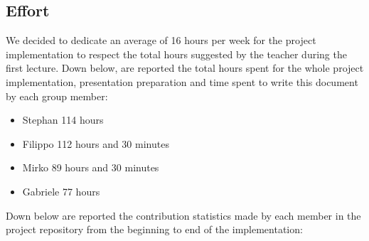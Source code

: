 \subsection{Effort}
We decided to dedicate an average of 16 hours per week for the project implementation to respect the total hours suggested by the teacher during the first lecture.\newline
Down below, are reported the total hours spent for the whole project implementation, presentation preparation and time spent to write this document by each group member:
\begin{itemize}
  \item Stephan 114 hours
  \item Filippo 112 hours and 30 minutes
  \item Mirko 89 hours and 30 minutes
  \item Gabriele 77 hours
\end{itemize}
Down below are reported the contribution statistics made by each member in the project repository from the beginning to end of the implementation:
